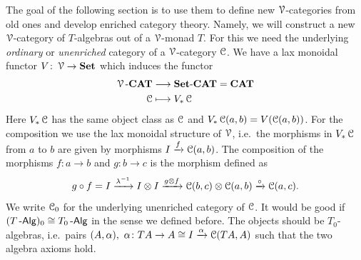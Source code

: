 \documentclass[a4paper,11pt,oneside,openany]{scrbook}
\begin{document}
The goal of the following section is to use them to define new $\operatorname{\mathcal{V}}$-categories from old ones and develop enriched category theory. Namely, we will construct a new $\operatorname{\mathcal{V}}$-category of $T$-algebras out of a $\operatorname{\mathcal{V}}$-monad $T$. For this we need the underlying \emph{ordinary} or \emph{unenriched} category of a $\operatorname{\mathcal{V}}$-category $\operatorname{\mathcal{C}}$. We have a lax monoidal functor $V\colon\operatorname{\mathcal{V}}\to{\normalfont\textbf{Set}}$ which induces the functor
\begin{align*}
	\operatorname{\mathcal{V}}\mbox{-}{\normalfont\textbf{CAT}} & \longrightarrow{\normalfont\textbf{Set}}\mbox{-}{\normalfont\textbf{CAT}}={\normalfont\textbf{CAT}} \\
	\operatorname{\mathcal{C}}             & \longmapsto V_*\operatorname{\mathcal{C}}
\end{align*}
Here $V_*\operatorname{\mathcal{C}}$ has the same object class as $\operatorname{\mathcal{C}}$ and $V_*\operatorname{\mathcal{C}}(a,b)=V(\operatorname{\mathcal{C}}(a,b))$. For
the composition we use the lax monoidal structure of $\operatorname{\mathcal{V}}$, i.e.\ the morphisms
in $V_*\operatorname{\mathcal{C}}$ from $a$ to $b$ are given by morphisms $I\xrightarrow{f}\operatorname{\mathcal{C}}(a,b)$. The
composition of the morphisms $f\colon a\to b$ and $g\colon b\to c$ is the
morphism defined as
$$g\circ f = I\xrightarrow{\lambda^{-1}} I\otimes I\xrightarrow{g\otimes f}\operatorname{\mathcal{C}}(b,c)\otimes\operatorname{\mathcal{C}}(a,b)\xrightarrow{\circ}\operatorname{\mathcal{C}}(a,c).$$
We write $\operatorname{\mathcal{C}}_0$ for the underlying unenriched category of $\operatorname{\mathcal{C}}$. It would be good
if $(T\operatorname{-\mathsf{Alg}})_0\cong T_0\operatorname{-\mathsf{Alg}}$ in the sense we defined before. The objects
should be $T_0$-algebras, i.e.\ pairs $(A,\alpha), \ \alpha\colon TA\to A\cong
I\xrightarrow{\alpha}\operatorname{\mathcal{C}}(TA,A)$ such that the two algebra axioms hold.
\end{document}
